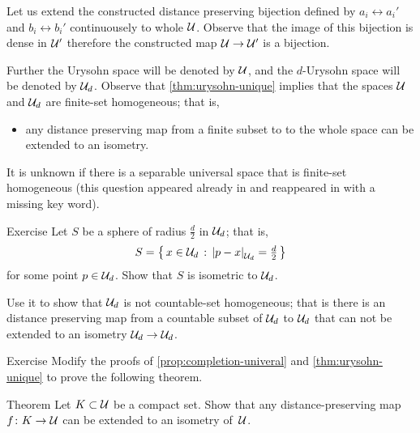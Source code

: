 Let us extend the constructed distance preserving bijection defined by $a_i\leftrightarrow a_i'$ and $b_i\leftrightarrow b_i'$ continuousely to whole $\mathcal{U}$.
Observe that the image of this bijection is dense in $\mathcal{U}'$ therefore the constructed map $\mathcal{U}\to \mathcal{U}'$ is a bijection.
\qeds

Further the Urysohn space will be denoted by $\mathcal{U}$, and the $d$-Urysohn space will be denoted by $\mathcal{U}_d$.
Observe that \ref{thm:urysohn-unique} implies that the spaces $\mathcal{U}$ and $\mathcal{U}_d$ are finite-set homogeneous; that is,
\begin{itemize}
 \item any distance preserving map from a finite subset to to the whole space can be extended to an isometry.
\end{itemize}
It is unknown if there is a separable universal space that is finite-set homogeneous (this question appeared already in \cite{urysohn} and reappeared in \cite[p. 83]{gromov-2007} with a missing key word). 


\begin{thm}{Exercise}\label{ex:sphere-in-urysohn}
Let $S$ be a sphere of radius $\tfrac d2$ in $\mathcal{U}_d$;
that is, 
\[S=\set{x\in \spc{U}_d}{\dist{p}{x}{\spc{U}_d}=\tfrac d2}\]
for some point $p\in \mathcal{U}_d$.
Show that $S$ is isometric to $\mathcal{U}_d$.

Use it to show that $\mathcal{U}_d$ is not countable-set homogeneous;
that is there is an distance preserving map from a countable subset of $\mathcal{U}_d$ to $\mathcal{U}_d$ that can not be extended to an isometry $\mathcal{U}_d\to \mathcal{U}_d$.
\end{thm}


\begin{thm}{Exercise}
Modify the proofs of \ref{prop:completion-univeral} and \ref{thm:urysohn-unique} to prove the following theorem.
\end{thm}

\begin{thm}{Theorem}\label{thm:compact-homogeneous}
Let $K\subset \mathcal{U}$ be a compact set.
Show that any distance-preserving map $f\colon K\to\mathcal{U}$ can be extended to 
an isometry of~$\mathcal{U}$.
\end{thm}










